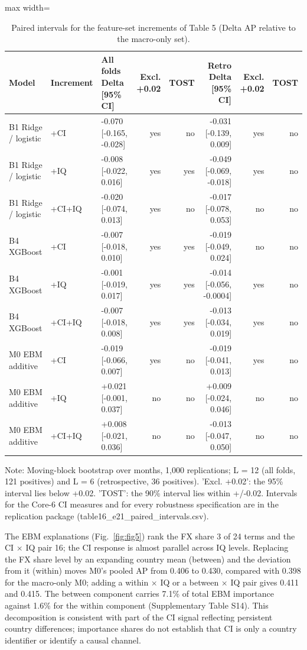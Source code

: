 \documentclass[preprint,12pt,authoryear]{elsarticle}
\begin{document}
\begin{table}[!htbp]
\centering
\scriptsize
\setlength{\tabcolsep}{3pt}
\caption{Paired intervals for the feature-set increments of Table 5 (Delta AP relative to the macro-only set).}
\label{tab:intervals}
\begin{adjustbox}{max width=\textwidth}
\begin{tabular}{lllrrrrr}
\toprule
Model & Increment & All folds Delta [95\% CI] & Excl. +0.02 & TOST & Retro Delta [95\% CI] & Excl. +0.02 & TOST \\
\midrule
B1 Ridge / logistic & +CI & -0.070 [-0.165, -0.028] & yes & no & -0.031 [-0.139, 0.009] & yes & no \\
B1 Ridge / logistic & +IQ & -0.008 [-0.022, 0.016] & yes & yes & -0.049 [-0.069, -0.018] & yes & no \\
B1 Ridge / logistic & +CI+IQ & -0.020 [-0.074, 0.013] & yes & no & -0.017 [-0.078, 0.053] & no & no \\
B4 XGBoost & +CI & -0.007 [-0.018, 0.010] & yes & yes & -0.019 [-0.049, 0.024] & no & no \\
B4 XGBoost & +IQ & -0.001 [-0.019, 0.017] & yes & yes & -0.014 [-0.056, -0.0004] & yes & no \\
B4 XGBoost & +CI+IQ & -0.007 [-0.018, 0.008] & yes & yes & -0.013 [-0.034, 0.019] & yes & no \\
M0 EBM additive & +CI & -0.019 [-0.066, 0.007] & yes & no & -0.019 [-0.041, 0.013] & yes & no \\
M0 EBM additive & +IQ & +0.021 [-0.001, 0.037] & no & no & +0.009 [-0.024, 0.046] & no & no \\
M0 EBM additive & +CI+IQ & +0.008 [-0.021, 0.036] & no & no & -0.013 [-0.047, 0.050] & no & no \\
\bottomrule
\end{tabular}
\end{adjustbox}
\par\vspace{2pt}\parbox{0.95\linewidth}{\scriptsize Note: Moving-block bootstrap over months, 1,000 replications; L = 12 (all folds, 121 positives) and L = 6 (retrospective, 36 positives). 'Excl. +0.02': the 95\% interval lies below +0.02. 'TOST': the 90\% interval lies within +/-0.02. Intervals for the Core-6 CI measures and for every robustness specification are in the replication package (table16\_e21\_paired\_intervals.csv).}
\end{table}
The EBM explanations (Fig.~\ref{fig:fig5}) rank the FX share 3 of 24 terms and the CI $\times$ IQ pair 16; the CI response is almost parallel across IQ levels. Replacing the FX share level by an expanding country mean (between) and the deviation from it (within) moves M0's pooled AP from 0.406 to 0.430, compared with 0.398 for the macro-only M0; adding a within $\times$ IQ or a between $\times$ IQ pair gives 0.411 and 0.415. The between component carries 7.1\% of total EBM importance against 1.6\% for the within component (Supplementary Table S14). This decomposition is consistent with part of the CI signal reflecting persistent country differences; importance shares do not establish that CI is only a country identifier or identify a causal channel.
\end{document}
